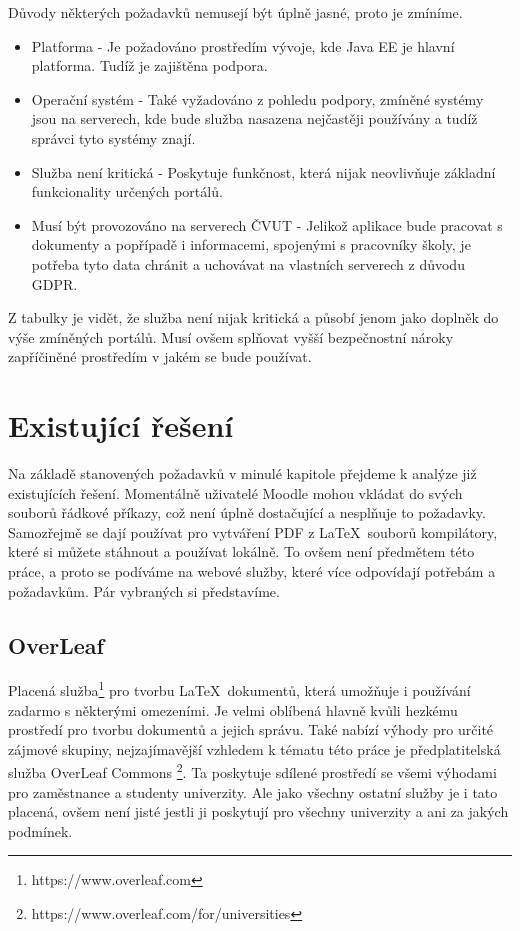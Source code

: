  Důvody některých požadavků nemusejí být úplně jasné, proto je zmíníme.
 \begin{itemize}
 	\item Platforma - Je požadováno prostředím vývoje, kde Java EE je hlavní platforma. Tudíž je zajištěna podpora. 
 	\item Operační systém - Také vyžadováno z pohledu podpory, zmíněné systémy jsou na serverech, kde bude služba nasazena nejčastěji používány a tudíž správci tyto systémy znají.   
 	\item Služba není kritická - Poskytuje funkčnost, která nijak neovlivňuje základní funkcionality určených portálů. 
 	\item Musí být provozováno na serverech ČVUT - Jelikož aplikace bude pracovat s dokumenty a popřípadě i informacemi, spojenými s pracovníky školy, je potřeba tyto data chránit a uchovávat na vlastních serverech z důvodu GDPR.
 \end{itemize}
 
 Z tabulky je vidět, že služba není nijak kritická a působí jenom jako doplněk do výše zmíněných portálů. Musí ovšem splňovat vyšší bezpečnostní nároky zapříčiněné prostředím v jakém se bude používat. 

\section{Existující řešení}
Na základě stanovených požadavků v minulé kapitole přejdeme k analýze již existujících řešení. Momentálně uživatelé Moodle mohou vkládat do svých souborů řádkové příkazy, což není úplně dostačující a nesplňuje to požadavky. Samozřejmě se dají používat pro vytváření PDF z \LaTeX\ souborů kompilátory, které si můžete stáhnout a používat lokálně. To ovšem není předmětem této práce, a proto se podíváme na webové služby, které více odpovídají potřebám a požadavkům. Pár vybraných si představíme.  

\subsection{OverLeaf}
Placená služba\footnote{https://www.overleaf.com} pro tvorbu \LaTeX\ dokumentů, která umožňuje i používání zadarmo s některými omezeními. Je velmi oblíbená hlavně kvůli hezkému prostředí pro tvorbu dokumentů a jejich správu. Také nabízí výhody pro určité zájmové skupiny, nejzajímavější vzhledem k tématu této práce je předplatitelská služba OverLeaf Commons \footnote{https://www.overleaf.com/for/universities}. Ta poskytuje sdílené prostředí se všemi výhodami pro zaměstnance a studenty univerzity. Ale jako všechny ostatní služby je i tato placená, ovšem není jisté jestli ji poskytují pro všechny univerzity a ani za jakých podmínek.

